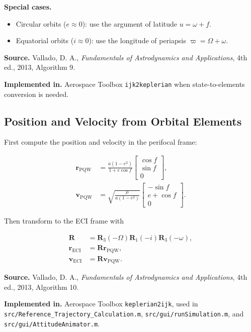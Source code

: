 \documentclass[11pt]{article}
\newcommand{\vect}[1]{\boldsymbol{#1}}
\begin{document}
\textbf{Special cases.}
\begin{itemize}
\item Circular orbits ($e \approx 0$): use the argument of latitude
$u = \omega + f$.
\item Equatorial orbits ($i \approx 0$): use the longitude of periapsis
$\varpi = \Omega + \omega$.
\end{itemize}

\textbf{Source.} Vallado, D. A., \emph{Fundamentals of Astrodynamics and
Applications}, 4th ed., 2013, Algorithm 9.

\textbf{Implemented in.} Aerospace Toolbox \texttt{ijk2keplerian} when
state-to-elements conversion is needed.

\subsection{Position and Velocity from Orbital Elements}

First compute the position and velocity in the perifocal frame:

\begin{align}
\vect{r}_{\mathrm{PQW}} &= \frac{a(1-e^2)}{1 + e\cos f}
\begin{bmatrix}
\cos f \\
\sin f \\
0
\end{bmatrix}, \\
\vect{v}_{\mathrm{PQW}} &= \sqrt{\frac{\mu}{a(1-e^2)}}
\begin{bmatrix}
-\sin f \\
e + \cos f \\
0
\end{bmatrix}.
\end{align}

Then transform to the ECI frame with

\begin{align}
\mathbf{R} &= \mathbf{R}_3(-\Omega)\mathbf{R}_1(-i)\mathbf{R}_3(-\omega), \\
\vect{r}_{\mathrm{ECI}} &= \mathbf{R}\vect{r}_{\mathrm{PQW}}, \\
\vect{v}_{\mathrm{ECI}} &= \mathbf{R}\vect{v}_{\mathrm{PQW}}.
\end{align}

\textbf{Source.} Vallado, D. A., \emph{Fundamentals of Astrodynamics and
Applications}, 4th ed., 2013, Algorithm 10.

\textbf{Implemented in.} Aerospace Toolbox \texttt{keplerian2ijk}, used
in \texttt{src/Reference\_Trajectory\_Calculation.m},
\texttt{src/gui/runSimulation.m}, and
\texttt{src/gui/AttitudeAnimator.m}.
\end{document}
